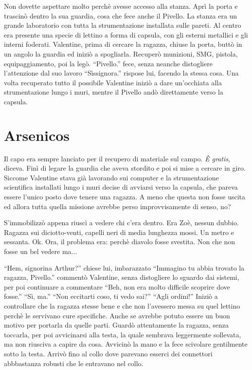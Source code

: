     Non dovette aspettare molto perchè avesse accesso alla stanza. Aprì la porta e trascinò dentro la sua guardia, cosa
    che fece anche il Pivello. La stanza era un grande laboratorio con tutta la strumentazione installata sulle pareti.
    Al centro era presente una specie di lettino a forma di capsula, con gli esterni metallici e gli interni foderati.
    Valentine, prima di cercare la ragazza, chiuse la porta, buttò in un angolo la guardia ed iniziò a spogliarla.
    Recuperò munizioni, SMG, pistola, equipaggiamento, poi la legò. ``Pivello.'' fece, senza neanche distogliere
    l'attenzione dal suo lavoro ``Sìssignora.'' rispose lui, facendo la stessa cosa. Una volta recuperato tutto il
    possibile Valentine iniziò a dare un'occhiata alla strumentazione lungo i muri, mentre il Pivello andò direttamente
    verso la capsula.

  \section*{Arsenicos}

    Il capo era sempre lanciato per il recupero di materiale sul campo. \emph{È gratis}, diceva. Finì di legare la
    guardia che aveva stordito e poi si mise a cercare in giro. Siccome Valentine stava già lavorando sui computer e la
    strumentazione scientifica installati lungo i muri decise di avviarsi verso la capsula, che pareva essere l'unico
    posto dove tenere una ragazza. A meno che questa non fosse uscita ed allora tutta quella missione avrebbe perso
    improvvisamente di senso, no?

    S'immobilizzò appena riuscì a vedere chi c'era dentro. Era Zoè, nessun dubbio. Ragazza sui diciotto-venti, capelli
    neri di media lunghezza mossi. Un metro e sessanta. Ok. Ora, il problema era: perchè diavolo fosse svestita. Non che
    non fosse un bel vedere ma...

    ``Hem, signorina Arthur?'' chiese lui, imbarazzato ``Immagino tu abbia trovato la ragazza, Pivello.''  commentò
    Valentine, senza distogliere lo sguardo dai sistemi, per poi continuare a commentare ``Beh, non era molto difficile
    scoprire dove fosse.'' ``Sì, ma.'' ``Non eccitarti coso, ti vedo sai?'' ``Agli ordini!'' Iniziò a controllare che la
    ragazza stesse bene e che non l'avessero messa su quel lettino perchè le servivano cure specifiche. Anche se avrebbe
    potuto essere un buon motivo per portarla da quelle parti. Guardò attentamente la ragazza, senza toccarla, per poi
    avvicinarsi alla testa, la quale sembrava leggermente sollevata, ma non riusciva a capire da cosa. Avvicinò la mano
    e la fece scivolare gentilmente sotto la testa. Arrivò fino al collo dove parevano esserci dei connettori abbbastanza robusti
    che le entravano nel collo.

